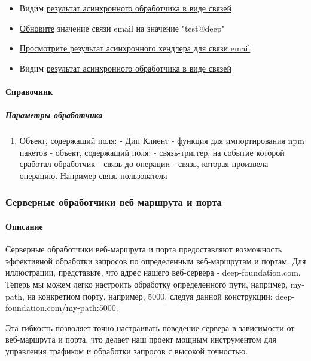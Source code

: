 \begin{itemize}
      \item Видим \hyperlink{Handlers.Async.Result}{результат асинхронного
                  обработчика в виде связей}
      \item \hyperlink{DeepCase.UpdateLink.Description}{Обновите} значение
            связи email на значение "test@deep"
      \item \hyperlink{Handlers.Async.HowToGetResult}{Просмотрите результат
                  асинхронного хендлера для связи email}
      \item Видим \hyperlink{Handlers.Async.Result}{результат асинхронного
                  обработчика в виде связей}
\end{itemize}

\paragraph{Справочник}
\subparagraph{Параметры обработчика}
\begin{enumerate}
      \item Объект, содержащий поля:
             - Дип Клиент
             - функция для импортирования npm пакетов
             - объект, содержащий поля:
             - связь-триггер, на событие которой сработал
            обработчик
             - связь до операции
             - связь, которая произвела операцию.
            Например связь пользователя
\end{enumerate}
\subsubsection{Серверные обработчики веб маршрута и порта}
\paragraph{Описание}
Серверные обработчики веб-маршрута и порта предоставляют возможность
эффективной обработки запросов по определенным веб-маршрутам и портам. Для
иллюстрации, представьте, что адрес нашего веб-сервера - deep-foundation.com.
Теперь мы можем легко настроить обработку определенного пути, например,
my-path, на конкретном порту, например, 5000, следуя данной конструкции:
deep-foundation.com/my-path:5000.

Эта гибкость позволяет точно настраивать поведение сервера в зависимости от
веб-маршрута и порта, что делает наш проект мощным инструментом для управления
трафиком и обработки запросов с высокой точностью.

